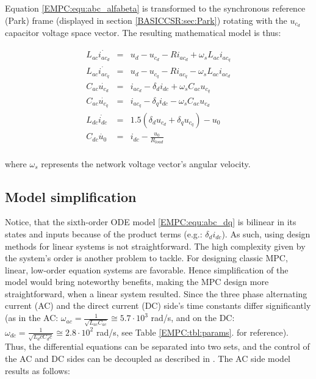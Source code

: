     Equation \ref{EMPC:equ:abc_alfabeta} is transformed to the synchronous reference (Park) frame (displayed in section \ref{BASICCSR:sec:Park}) rotating with the $u_{c_d}$ capacitor voltage space vector. The resulting mathematical model is thus:

    \begin{equation}
        \begin{array}{rcl}
            L_{ac}\dot{i_{ac_d}}&=&u_d-u_{c_d}-Ri_{ac_d}+\omega_s L_{ac}i_{ac_q}\\
            L_{ac}\dot{i_{ac_q}}&=&u_d-u_{c_q}-Ri_{ac_q}-\omega_s L_{ac}i_{ac_d}\\
            C_{ac}\dot{u_{c_d}}&=&i_{ac_d}-\delta_di_{dc}+\omega_s C_{ac}u_{c_q}\\
            C_{ac}\dot{u_{c_q}}&=&i_{ac_q}-\delta_qi_{dc}-\omega_s C_{ac}u_{c_d}\\
            L_{dc}\dot{i_{dc}}&=&1.5(\delta_d u_{c_d}+\delta_q u_{c_q})-u_0\\
            C_{dc}\dot{u_0}&=&i_{dc}-\frac{u_0}{R_{load}}\\
        \end{array}
        \label{EMPC:equ:abc_dq}
    \end{equation}

    where $\omega_s$ represents the network voltage vector’s angular velocity.

    \subsection{Model simplification}\label{EMPC:sec:Simplification}

    Notice, that the sixth-order ODE model \ref{EMPC:equ:abc_dq} is bilinear in its states and
    inputs because of the product terms (e.g.: $\delta_di_{dc}$). As such, using design methods for linear systems is not straightforward. The high complexity given by the system’s order is another problem to tackle. For designing classic MPC, linear, low-order equation systems are favorable. Hence simplification of the model would bring noteworthy benefits, making the MPC design more straightforward, when a linear system resulted.
    Since the three phase alternating current (AC) and the direct current (DC) side’s time constants differ significantly (as in the AC: $\omega_{ac}=\frac{1}{\sqrt{L_{ac} C_{ac}}}\cong5.7\cdot10^3$ rad/s, and on the DC: $\omega_{dc}=\frac{1}{\sqrt{L_dc C_dc}}\cong2.8\cdot10^2$ rad/s, see Table \ref{EMPC:tbl:params}. for reference). Thus, the differential equations can be separated into two sets, and the control of the AC and DC sides can be decoupled as described in \cite{ahmed2014model}. The AC side model results as follows:


